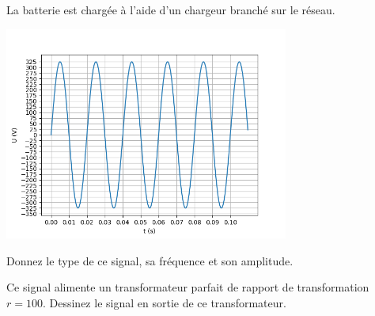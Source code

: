 \documentclass[10pt,fleqn]{article} %
\begin{document}
La batterie est chargée à l'aide d'un chargeur branché sur le réseau.

\begin{center}
  \includegraphics[width=0.7\textwidth]{images/reseau_edf_signal}
\end{center}
\begin{question}
  Donnez le type de ce signal, sa fréquence et son amplitude.
\end{question}
\begin{question}
  Ce signal alimente un transformateur parfait de rapport de transformation $r=100$. Dessinez le signal en sortie de ce transformateur.
\end{question}
\end{document}
